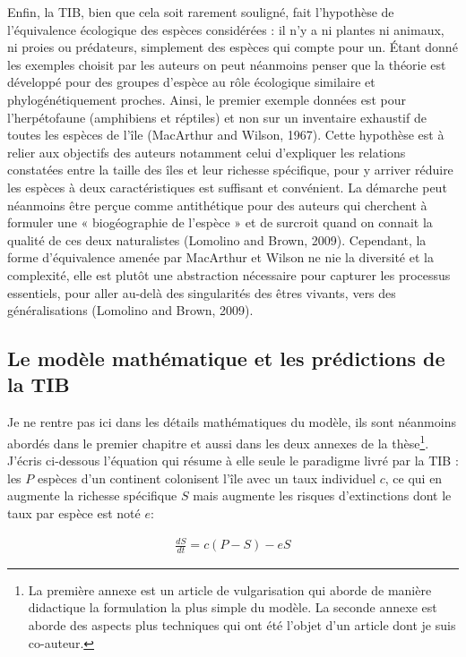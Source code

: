 Enfin, la TIB, bien que cela soit rarement souligné, fait l'hypothèse de
l'équivalence écologique des espèces considérées : il n'y a ni plantes
ni animaux, ni proies ou prédateurs, simplement des espèces qui compte
pour un. Étant donné les exemples choisit par les auteurs on peut
néanmoins penser que la théorie est développé pour des groupes d'espèce
au rôle écologique similaire et phylogénétiquement proches. Ainsi, le
premier exemple données est pour l'herpétofaune (amphibiens et réptiles)
et non sur un inventaire exhaustif de toutes les espèces de l'île
(MacArthur and Wilson, 1967). Cette hypothèse est à relier aux objectifs
des auteurs notamment celui d'expliquer les relations constatées entre
la taille des îles et leur richesse spécifique, pour y arriver réduire
les espèces à deux caractéristiques est suffisant et convénient. La
démarche peut néanmoins être perçue comme antithétique pour des auteurs
qui cherchent à formuler une « biogéographie de l'espèce » et de
surcroit quand on connait la qualité de ces deux naturalistes (Lomolino
and Brown, 2009). Cependant, la forme d'équivalence amenée par MacArthur
et Wilson ne nie la diversité et la complexité, elle est plutôt une
abstraction nécessaire pour capturer les processus essentiels, pour
aller au-delà des singularités des êtres vivants, vers des
généralisations (Lomolino and Brown, 2009).

\subsection*{Le modèle mathématique et les prédictions de la
TIB}\label{le-moduxe8le-mathuxe9matique-et-les-pruxe9dictions-de-la-tib}

Je ne rentre pas ici dans les détails mathématiques du modèle, ils sont
néanmoins abordés dans le premier chapitre et aussi dans les deux
annexes de la thèse\footnote{La première annexe est un article de
  vulgarisation qui aborde de manière didactique la formulation la plus
  simple du modèle. La seconde annexe est aborde des aspects plus
  techniques qui ont été l'objet d'un article dont je suis co-auteur.}.
J'écris ci-dessous l'équation qui résume à elle seule le paradigme livré
par la TIB : les \(P\) espèces d'un continent colonisent l'île avec un
taux individuel \(c\), ce qui en augmente la richesse spécifique \(S\)
mais augmente les risques d'extinctions dont le taux par espèce est noté
\(e\):

\begin{eqnarray}
\label{eqMW}
\frac{dS}{dt} = c(P-S)-eS
\end{eqnarray}

